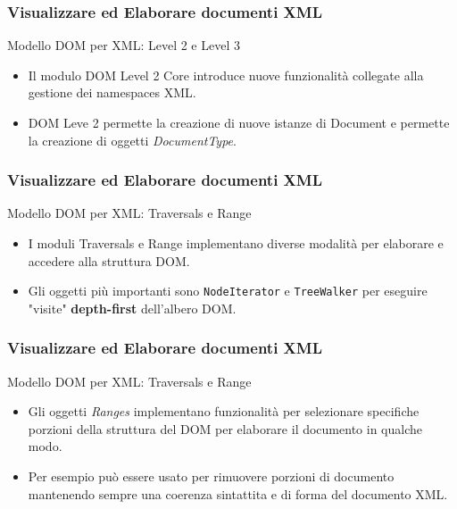 \begin{frame}
    \frametitle{Visualizzare ed Elaborare documenti XML}
    \addtocounter{nframe}{1}

     \begin{block}{Modello DOM per XML: Level 2 e Level 3}
        \begin{itemize}
            \item Il modulo DOM Level 2 Core introduce nuove funzionalità collegate alla gestione dei namespaces XML.
            \item DOM Leve 2 permette la creazione di nuove istanze di Document e permette la creazione di oggetti \textit{DocumentType}.
        \end{itemize}
       
     \end{block}
    
\end{frame}

\begin{frame}
    \frametitle{Visualizzare ed Elaborare documenti XML}
    \addtocounter{nframe}{1}

     \begin{block}{Modello DOM per XML: Traversals e Range}
        \begin{itemize}
            \item I moduli Traversals e Range implementano diverse modalità per elaborare e accedere alla struttura DOM.
            \item Gli oggetti più importanti sono \texttt{NodeIterator} e \texttt{TreeWalker} per eseguire "visite" \textbf{depth-first} dell'albero DOM.
        \end{itemize}
       
     \end{block}

\end{frame}

\begin{frame}
    \frametitle{Visualizzare ed Elaborare documenti XML}
    \addtocounter{nframe}{1}

     \begin{block}{Modello DOM per XML: Traversals e Range}
        \begin{itemize}
            \item Gli oggetti \textit{Ranges} implementano funzionalità per selezionare specifiche porzioni della struttura del DOM per elaborare il documento in qualche modo.
            \item Per esempio può essere usato per rimuovere porzioni di documento mantenendo sempre una coerenza sintattita e di forma del documento XML.
        \end{itemize}
       
     \end{block}
          
\end{frame}


